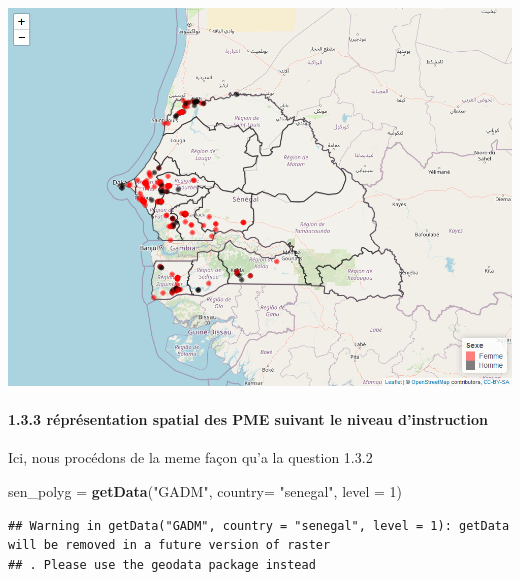 \documentclass[
]{article}
\newenvironment{Shaded}{\begin{snugshade}}{\end{snugshade}}
\newcommand{\AttributeTok}[1]{\textcolor[rgb]{0.13,0.29,0.53}{#1}}
\newcommand{\DecValTok}[1]{\textcolor[rgb]{0.00,0.00,0.81}{#1}}
\newcommand{\FunctionTok}[1]{\textcolor[rgb]{0.13,0.29,0.53}{\textbf{#1}}}
\newcommand{\NormalTok}[1]{#1}
\newcommand{\OtherTok}[1]{\textcolor[rgb]{0.56,0.35,0.01}{#1}}
\newcommand{\StringTok}[1]{\textcolor[rgb]{0.31,0.60,0.02}{#1}}
\begin{document}
\includegraphics{TP-R-ESSAI_files/figure-latex/unnamed-chunk-9-1.png}

\hypertarget{ruxe9pruxe9sentation-spatial-des-pme-suivant-le-niveau-dinstruction}{%
\paragraph{1.3.3 réprésentation spatial des PME suivant le niveau
d'instruction}\label{ruxe9pruxe9sentation-spatial-des-pme-suivant-le-niveau-dinstruction}}

Ici, nous procédons de la meme façon qu'a la question 1.3.2

\begin{Shaded}
\begin{Highlighting}[]
\NormalTok{sen\_polyg }\OtherTok{=} \FunctionTok{getData}\NormalTok{(}\StringTok{"GADM"}\NormalTok{, }\AttributeTok{country=} \StringTok{"senegal"}\NormalTok{, }\AttributeTok{level =} \DecValTok{1}\NormalTok{)}
\end{Highlighting}
\end{Shaded}

\begin{verbatim}
## Warning in getData("GADM", country = "senegal", level = 1): getData will be removed in a future version of raster
## . Please use the geodata package instead
\end{verbatim}
\end{document}
